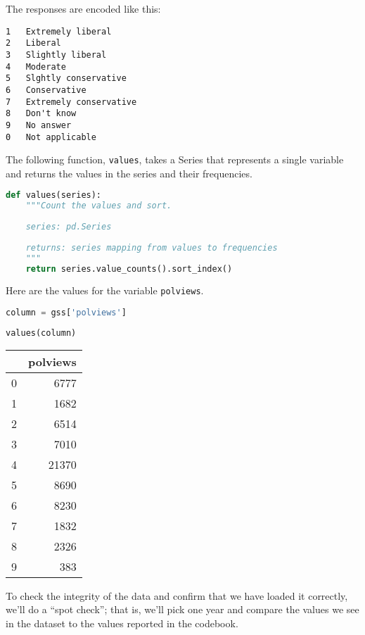 The responses are encoded like this:

\begin{lstlisting}[style=output]
1   Extremely liberal
2   Liberal
3   Slightly liberal
4   Moderate
5   Slghtly conservative
6   Conservative
7   Extremely conservative
8   Don't know
9   No answer
0   Not applicable
\end{lstlisting}

The following function, \passthrough{\lstinline!values!}, takes a Series
that represents a single variable and returns the values in the series
and their frequencies.

\begin{lstlisting}[language=Python,style=source]
def values(series):
    """Count the values and sort.
    
    series: pd.Series
    
    returns: series mapping from values to frequencies
    """
    return series.value_counts().sort_index()
\end{lstlisting}

Here are the values for the variable \passthrough{\lstinline!polviews!}.

\begin{lstlisting}[language=Python,style=source]
column = gss['polviews']
\end{lstlisting}

\begin{lstlisting}[language=Python,style=source]
values(column)
\end{lstlisting}

\begin{tabular}{lr}
\toprule
{} &  polviews \\
\midrule
0 &      6777 \\
1 &      1682 \\
2 &      6514 \\
3 &      7010 \\
4 &     21370 \\
5 &      8690 \\
6 &      8230 \\
7 &      1832 \\
8 &      2326 \\
9 &       383 \\
\bottomrule
\end{tabular}

To check the integrity of the data and confirm that we have loaded it
correctly, we'll do a ``spot check''; that is, we'll pick one year and
compare the values we see in the dataset to the values reported in the
codebook.

